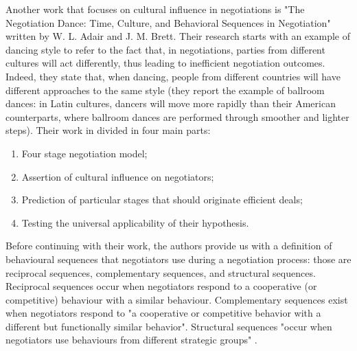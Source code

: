 \documentclass[../main.tex]{subfiles}
\begin{document}
Another work that focuses on cultural influence in negotiations is "The Negotiation Dance: Time, Culture, and Behavioral Sequences in Negotiation" written by W. L. Adair and J. M. Brett. Their research starts with an example of dancing style to refer to the fact that, in negotiations, parties from different cultures will act differently, thus leading to inefficient negotiation outcomes. Indeed, they state that, when dancing, people from different countries will have different approaches to the same style (they report the example of ballroom dances: in Latin cultures, dancers will move more rapidly than their American counterparts, where ballroom dances are performed through smoother and lighter steps). Their work in divided in four main parts:
\begin{enumerate}
\item Four stage negotiation model;
\item Assertion of cultural influence on negotiators;
\item Prediction of particular stages that should originate efficient deals;
\item Testing the universal applicability of their hypothesis.
\end{enumerate}
Before continuing with their work, the authors provide us with a definition of behavioural sequences that negotiators use during a negotiation process: those are reciprocal sequences, complementary sequences, and structural sequences. Reciprocal sequences occur when negotiators respond to a cooperative (or competitive) behaviour with a similar behaviour. Complementary sequences exist when negotiators respond to "a cooperative or competitive behavior with a different but functionally similar behavior". Structural sequences "occur when negotiators use behaviours from different strategic groups" \autocite[35]{adair}.
\end{document}
